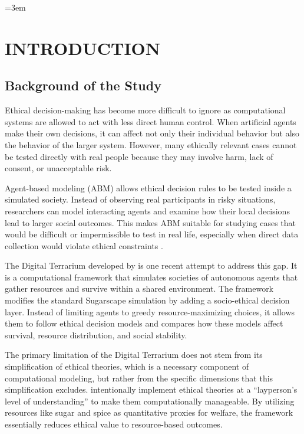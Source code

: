 \documentclass{icsthesis}
\begin{document}
	\begin{mainmatter}
\emergencystretch=3em
				\section{INTRODUCTION}
			\subsection{Background of the Study}

Ethical decision-making has become more difficult to ignore as computational systems are allowed to act with less direct human control. When artificial agents make their own decisions, it can affect not only their individual behavior but also the behavior of the larger system. However, many ethically relevant cases cannot be tested directly with real people because they may involve harm, lack of consent, or unacceptable risk.

Agent-based modeling (ABM) allows ethical decision rules to be tested inside a simulated society. Instead of observing real participants in risky situations, researchers can model interacting agents and examine how their local decisions lead to larger social outcomes. This makes ABM suitable for studying cases that would be difficult or impermissible to test in real life, especially when direct data collection would violate ethical constraints \citep{LasquetyReyes2018, Slater2006, Groff2019}.

The Digital Terrarium developed by \citet{KremerHerman2024b} is one recent attempt to address this gap. It is a computational framework that simulates societies of autonomous agents that gather resources and survive within a shared environment. The framework modifies the standard Sugarscape simulation by adding a socio-ethical decision layer. Instead of limiting agents to greedy resource-maximizing choices, it allows them to follow ethical decision models and compares how these models affect survival, resource distribution, and social stability.

The primary limitation of the Digital Terrarium does not stem from its simplification of ethical theories, which is a necessary component of computational modeling, but rather from the specific dimensions that this simplification excludes. \citet{KremerHerman2024b} intentionally implement ethical theories at a ``layperson's level of understanding'' to make them computationally manageable. By utilizing resources like sugar and spice as quantitative proxies for welfare, the framework essentially reduces ethical value to resource-based outcomes.


\end{mainmatter}
\end{document}
